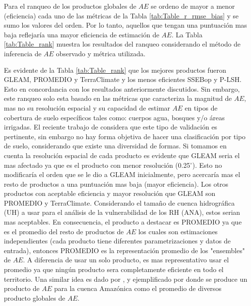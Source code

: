 \documentclass[12pt]{article}
\begin{document}


Para el ranqueo de los productos globales de $AE$ se ordeno de mayor a menor (eficiencia) cada uno de las métricas de la Tabla \ref{tab:Table_r_rmse_bias} y se sumo los valores del orden. Por lo tanto, aquellos que tengan una puntuación mas baja reflejaría una mayor eficiencia de estimación de $AE$. La Tabla \ref{tab:Table_rank} muestra los resultados del ranqueo considerando el método de inferencia de $AE$ observado y métrica utilizada. 



Es evidente de la Tabla \ref{tab:Table_rank} que los mejores productos fueron GLEAM, PROMEDIO y TerraClimate y los menos eficientes SSEBop y P-LSH. Esto en concordancia con los resultados anteriormente discutidos. Sin embargo, este ranqueo solo esta basado en las métricas que caracteriza la magnitud de $AE$, mas no su resolución espacial y su capacidad de estimar $AE$ en tipos de cobertura de suelo específicos tales como: cuerpos agua, bosques y/o áreas irrigadas. El reciente trabajo de \citet{Weerasinghe2019discuss} considera que este tipo de validación es pertinente, sin embargo no hay forma objetiva de hacer una clasificación por tipo de suelo, considerando que existe una diversidad de formas. Si tomamos en cuenta la resolución espacial de cada producto es evidente que GLEAM seria el mas afectado ya que es el producto con menor resolución (0.25$^{\circ}$). Esto no modificaría el orden que se le dio a GLEAM inicialmente, pero acercaría mas el resto de productos a una puntuación mas baja (mayor eficiencia). Los otros productos con aceptable eficiencia y mayor resolución que GLEAM son PROMEDIO y TerraClimate. Considerando el tamaño de cuenca hidrográfica (UH) a usar para el análisis de la vulnerabilidad de los RH (ANA), estos serian mas aceptables. En consecuencia, el producto a destacar es PROMEDIO ya que es el promedio del resto de productos de $AE$ los cuales son estimaciones independientes (cada producto tiene diferentes parametrizaciones y datos de entrada), entonces PROMEDIO es la representación promedio de los "ensembles" de $AE$. A diferencia de usar un solo producto, es mas representativo usar el promedio ya que ningún producto sera completamente eficiente en todo el territorio. Una similar idea es dado por \citet{zhang2016review}, y ejemplificado por \citet{da2019spatial} donde se produce un producto de $AE$ para la cuenca Amazónica como el promedio de diversos producto globales de $AE$.
\end{document}
